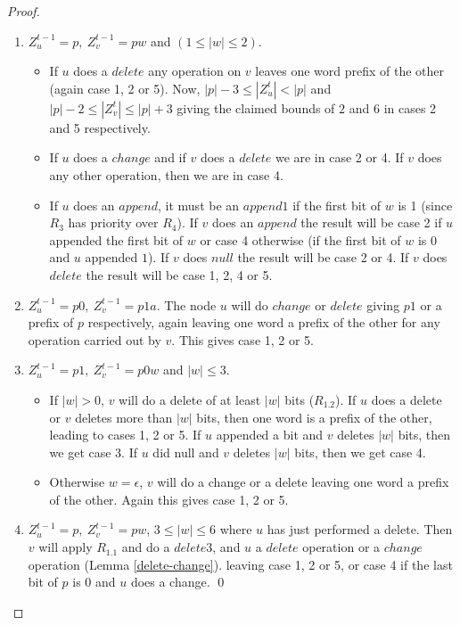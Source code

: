 \documentclass[11pt,envcountsame,letterpaper]{llncs}
\begin{document}
\begin{proof}
\begin{enumerate}
\item $Z_u^{t-1}=p,~Z_v^{t-1}=pw$ and $(1\leq |w|\leq 2)$. 
\begin{itemize}
\item
 If $u$ does a $delete$ any operation on $v$ leaves one
word prefix of the other (again case 1, 2 or 5). 
Now, $|p|-3 \le |Z_u^t| < |p|$ and $|p|-2 \le |Z_v^t| \le |p|+3$ giving the claimed bounds of $2$ and $6$ in cases 2 and 5 respectively.
\item If $u$ does a $change$ and if  $v$ does a $delete$
we are in case 2 or 4. 
If $v$ does any other operation, then we are in case 4.
\item If $u$ does an $append$, it must be an $append1$ if the first bit 
of $w$ is 1 (since $R_3$ has priority over $R_4$).
If $v$ does an $append$  the result will be case 2
if $u$ appended the first bit of $w$ or case 4 otherwise (if the first bit of $w$ is $0$ and $u$ appended $1$).
If $v$ does $null$ the result will be case 2 or 4.
If $v$ does $delete$ the result will be case 1, 2, 4 or 5.
\end{itemize}

\item $Z_u^{t-1}=p0,~Z_v^{t-1}=p1a$. The node $u$ will do $change$ or $delete$ giving
$p1$  or a prefix of $p$ respectively, again leaving one word a prefix 
of the other for any operation carried out by $v$.
This gives case 1, 2 or 5.

\item $Z_u^{t-1}=p1,~Z_v^{t-1}=p0w$ and  $ |w|\leq 3$. 
\begin{itemize}
\item If $|w|>0$, $v$ will do a delete of at least $|w|$ bits ($R_{1.2}$). If $u$ does a delete or $v$ deletes more than $|w|$ bits, then one word is a prefix
of the other, leading to cases 1, 2 or 5.
If $u$ appended a bit and $v$ deletes $|w|$ bits, then we get case 3.
If $u$ did null and $v$ deletes $|w|$ bits, then we get case 4.
\item Otherwise $w=\epsilon$, $v$ will do a change 
or a delete leaving one word a prefix of the other. Again
this gives case 1, 2 or 5.


\end{itemize}
\item $Z_u^{t-1}=p,~Z_v^{t-1}=pw$, $3\leq|w| \leq 6$ 
where $u$ has just performed a delete.
Then $v$ will apply $R_{1.1}$ and do a $delete3$, and $u$ a $delete$ operation or
a $change$ operation (Lemma \ref{delete-change}).
leaving case 1, 2 or 5, or case 4 if the last bit
of $p$ is 0 and $u$ does a change.
\qed
\end{enumerate}
\end{proof}
\end{document}
